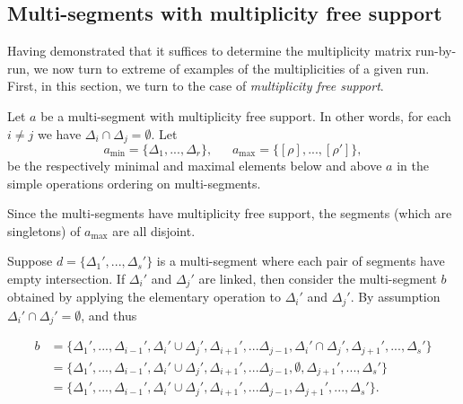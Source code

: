 \documentclass{memoir}
\newcommand{\tx}{\text}
\theoremstyle{definition}
\begin{document}
	
	
	
	
	
	
	
	
	
	
	
	
	
	
	
	
	
	
	
	
	\subsection{Multi-segments with multiplicity free support}
	
	Having demonstrated that it suffices to determine the multiplicity matrix run-by-run, we now turn to extreme of examples of the multiplicities of a given run.  
	First, in this section, we turn to the case of \emph{multiplicity free support}.  
	
	Let $a$ be a multi-segment with multiplicity free support.  
	In other words, for each $i\neq j$ we have $\Delta_i\cap \Delta_j=\emptyset$.  
	Let 
	$$a_{\tx{min}}=\{\Delta_1, ..., \Delta_r\}, \ \ \ \ \ \ \ a_{\tx{max}}=\{[\rho], ..., [\rho']\},$$
	be the respectively minimal and maximal elements below and above $a$ in the simple operations ordering on multi-segments.  
	
	Since the multi-segments have multiplicity free support, the segments (which are singletons) of $a_{\tx{max}}$ are all disjoint.  
	
 	Suppose $d=\{\Delta_1', ..., \Delta_s'\}$ is a multi-segment where each pair of segments have empty intersection. 
 	If $\Delta_i'$ and $\Delta_j'$ are linked, then consider the multi-segment $b$ obtained by applying the elementary operation to $\Delta_i'$ and $\Delta_j'$.  
 	By assumption $\Delta_i'\cap\Delta_j'=\emptyset$, and thus
 	
 	\begin{align*}
 	b&=\{\Delta_1', ..., \Delta_{i-1}', \Delta_i'\cup\Delta_j', \Delta_{i+1}',  ... \Delta_{j-1}, \Delta_i'\cap \Delta_j', \Delta_{j+1}', ..., \Delta_s'\}\\
 	&=\{\Delta_1', ..., \Delta_{i-1}', \Delta_i'\cup\Delta_j', \Delta_{i+1}',  ... \Delta_{j-1}, \emptyset, \Delta_{j+1}', ..., \Delta_s'\}\\
 		&=\{\Delta_1', ..., \Delta_{i-1}', \Delta_i'\cup\Delta_j', \Delta_{i+1}',  ... \Delta_{j-1}, \Delta_{j+1}', ..., \Delta_s'\}.
 	\end{align*}
 	
\end{document}
